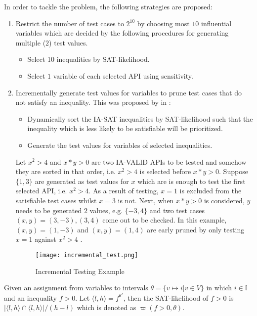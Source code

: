 In order to tackle the problem, the following strategies are proposed:
\begin{enumerate}
\item Restrict the number of test cases to $2^{10}$ by choosing most $10$ influential variables which are decided by the following procedures for generating multiple ($2$) test values.
\begin{itemize}
\item Select 10 inequalities by SAT-likelihood.
\item Select $1$ variable of each selected API using sensitivity.
\end{itemize}
\item Incrementally generate test values for variables to prune test cases that do not satisfy an inequality. This was proposed by \citeauthor{khanhReport} in \cite{khanhReport}:
\begin{itemize}
\item Dynamically sort the IA-SAT inequalities by SAT-likelihood such that the inequality which is less likely to be satisfiable will be prioritized.
\item Generate the test values for variables of selected inequalities.
\end{itemize}
\begin{example}
Let $x^2 > 4$ and $x*y > 0$ are two IA-VALID APIs to be tested and somehow they are sorted in that order, i.e. $x^2 > 4$ is selected before $x*y > 0$. Suppose $\{1, 3\}$ are generated as test values for $x$ which are is enough to test the first selected API, i.e. $x^2 > 4$. As a result of testing, $x = 1$ is excluded from the satisfiable test cases whilst $x = 3$ is not. Next, when $x*y > 0$ is considered, $y$ needs to be generated $2$ values, e.g. $\{-3, 4\}$ and two test cases $(x, y) = (3, -3), (3, 4)$ come out to be checked. In this example, $(x, y) = (1, -3)$ and  $(x, y) = (1, 4)$ are early pruned by only testing $x = 1$ against $x^2 > 4$ .
\end{example}
\begin{figure}[ht]
\centering
\texttt{[image: incremental\_test.png]} 
\caption{Incremental Testing Example} 
\label{fig:incremental-test} 
\end{figure} 
\end{enumerate}

\begin{definition}
Given an assignment from variables to intervals $\theta = \{v \mapsto i | v \in V\}$ in which $i \in \mathbb{I}$ and an inequality $f > 0$. Let $\langle l, h \rangle = f^{\theta^I}$, then the SAT-likelihood of $f > 0$ is $|\langle l, h \rangle \cap \langle l, h \rangle| / (h - l)$ which is denoted as $\varpi(f>0, \theta)$.
\end{definition}

